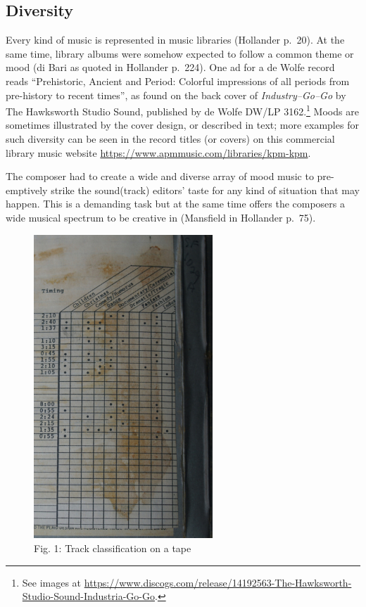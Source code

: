 \documentclass[a4paper,
fontsize=11pt,
oneside,
numbers=noperiodatend,
parskip=half-,
bibliography=totoc,
final
]{scrartcl}
\begin{document}
\hypertarget{diversity}{%
\subsection{Diversity}\label{diversity}}

Every kind of music is represented in music libraries (Hollander p.~20).
At the same time, library albums were somehow expected to follow a
common theme or mood (di Bari as quoted in Hollander p.~224). One ad for
a de Wolfe record reads \enquote{Prehistoric, Ancient and Period:
Colorful impressions of all periods from pre-history to recent times},
as found on the back cover of \emph{Industry--Go--Go} by The Hawksworth
Studio Sound, published by de Wolfe DW/LP 3162.\footnote{See images at
  \url{https://www.discogs.com/release/14192563-The-Hawksworth-Studio-Sound-Industria-Go-Go}.}
Moods are sometimes illustrated by the cover design, or described in
text; more examples for such diversity can be seen in the record titles
(or covers) on this commercial library music website
\url{https://www.apmmusic.com/libraries/kpm-kpm}.

The composer had to create a wide and diverse array of mood music to
pre-emptively strike the sound(track) editors' taste for any kind of
situation that may happen. This is a demanding task but at the same time
offers the composers a wide musical spectrum to be creative in
(Mansfield in Hollander p.~75).

\begin{figure}
\centering
\includegraphics[width=0.6\textwidth]{img/Fig1.jpg}
\caption{Fig. 1: Track classification on a tape}
\end{figure}
\end{document}
